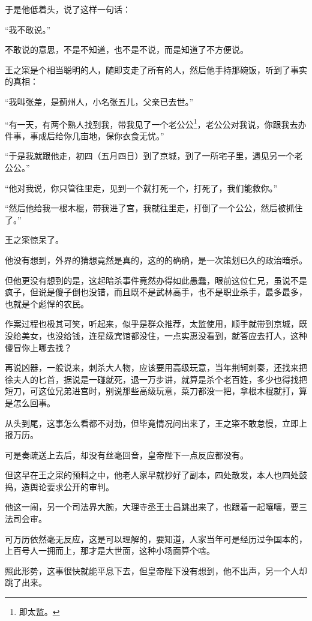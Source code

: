 \begin{multicols}{\theparacolNo}
		于是他低着头，说了这样一句话：

		“我不敢说。”

		不敢说的意思，不是不知道，也不是不说，而是知道了不方便说。

		王之寀是个相当聪明的人，随即支走了所有的人，然后他手持那碗饭，听到了事实的真相：

		“我叫张差，是蓟州人，小名张五儿，父亲已去世。”

		“有一天，有两个熟人找到我，带我见了一个老公公\footnote{即太监。}，老公公对我说，你跟我去办件事，事成后给你几亩地，保你衣食无忧。”

		“于是我就跟他走，初四（五月四日）到了京城，到了一所宅子里，遇见另一个老公公。”

		“他对我说，你只管往里走，见到一个就打死一个，打死了，我们能救你。”

		“然后他给我一根木棍，带我进了宫，我就往里走，打倒了一个公公，然后被抓住了。”

		王之寀惊呆了。

		他没有想到，外界的猜想竟然是真的，这的的确确，是一次策划已久的政治暗杀。

		但他更没有想到的是，这起暗杀事件竟然办得如此愚蠢，眼前这位仁兄，虽说不是疯子，但说是傻子倒也没错，而且既不是武林高手，也不是职业杀手，最多最多，也就是个彪悍的农民。

		作案过程也极其可笑，听起来，似乎是群众推荐，太监使用，顺手就带到京城，既没给美女，也没给钱，连星级宾馆都没住，一点实惠没看到，就答应去打人，这种傻冒你上哪去找？

		再说凶器，一般说来，刺杀大人物，应该要用高级玩意，当年荆轲刺秦，还找来把徐夫人的匕首，据说是一碰就死，退一万步讲，就算是杀个老百姓，多少也得找把短刀，可这位兄弟进宫时，别说那些高级玩意，菜刀都没一把，拿根木棍就打，算是怎么回事。

		从头到尾，这事怎么看都不对劲，但毕竟情况问出来了，王之寀不敢怠慢，立即上报万历。

		可是奏疏送上去后，却没有丝毫回音，皇帝陛下一点反应都没有。

		但这早在王之寀的预料之中，他老人家早就抄好了副本，四处散发，本人也四处鼓捣，造舆论要求公开的审判。

		他这一闹，另一个司法界大腕，大理寺丞王士昌跳出来了，也跟着一起嚷嚷，要三法司会审。

		可万历依然毫无反应，这是可以理解的，要知道，人家当年可是经历过争国本的，上百号人一拥而上，那才是大世面，这种小场面算个啥。

		照此形势，这事很快就能平息下去，但皇帝陛下没有想到，他不出声，另一个人却跳了出来。


\end{multicols}
